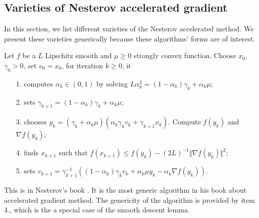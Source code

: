 \documentclass[12pt]{article}
\begin{document}
    \subsection{Varieties of Nesterov accelerated gradient}
        In this section, we list different varieties of the Nesterov accelerated method. 
        We present these varieties generically because these algorithms' forms are of interest.  
        \begin{definition}\label{def:agg_original}
            Let $f$ be a $L$ Lipschitz smooth and $\mu\ge 0$ strongly convex function. 
            Choose $x_0$, $\gamma_0 > 0$, set $v_0 = x_0$, for iteration $k\ge 0$, it
            \begin{enumerate}
                \item[1.] computes $\alpha_k \in (0, 1)$ by solving $L\alpha_k^2 = (1 - \alpha_k)\gamma_k + \alpha_k \mu$; 
                \item[2.] sets $\gamma_{k + 1} = (1 - \alpha_k)\gamma_k + \alpha_k \mu$;
                \item[3.] chooses $y_k = (\gamma_k + \alpha_k \mu)(\alpha_k \gamma_k v_k + \gamma_{k + 1}x_k)$. Compute $f(y_k)$ and $\nabla f(y_k)$; 
                \item[4.] finds $x_{k + 1}$ such that $f(x_{k + 1}) \le f(y_k) - (2L)^{-1} \Vert \nabla f(y_k)\Vert^2$; 
                \item[5.] sets $v_{k + 1} = \gamma_{k+1}^{-1}((1 - \alpha_k)\gamma_kv_k + \alpha_k \mu y_k - \alpha_k \nabla f(y_k))$. 
            \end{enumerate}
        \end{definition}
        \begin{remark}
            This is in Nesterov's book \cite[(2.2.7)]{nesterov_lectures_2018}. 
            It is the most generic algorithm in his book about accelerated gradient method. 
            The genericity of the algorithm is provided by item 4., which is the a special case of the smooth descent lemma. 

        \end{remark}
\end{document}
